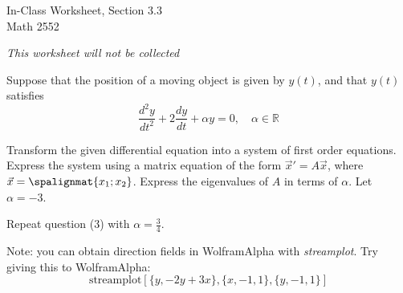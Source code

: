 \documentclass[12pt]{exam}
\newcommand{\TestName}{In-Class Worksheet, Section 3.3}
\newcommand{\dydt}{{\frac{dy}{dt}}} %
\newcommand{\dydtt}{{\frac{d ^2y}{dt^2}}} %
\begin{document}
    
\vspace*{-.5cm}

\newcommand{\Course}{Math 2552}

\begin{center}
{\Large \TestName 
\\[4pt]
\Course}
\end{center}

\begin{center}    
{\small
\textit{This worksheet will not be collected}
}
\end{center}

\vspace{.5cm}


Suppose that the position of a moving object is given by $y(t)$, and that $y(t)$ satisfies $$\dydtt + 2\dydt + \alpha y = 0, \quad \alpha \in \mathbb R$$

\begin{questions}
    
        \question Transform the given differential equation into a system of first order equations. Express the system using a matrix equation of the form $\vec x ' = A \vec x$, where $\vec x = \spalignmat{x_1;x_2}$. 
        \question Express the eigenvalues of $A$ in terms of $\alpha$. 
        \question Let $\alpha = -3$. 
    
    \question Repeat question (3) with $\displaystyle \alpha = \frac34$.

\end{questions}

Note: you can obtain direction fields in WolframAlpha with \textit{streamplot}. Try giving this to WolframAlpha: $$\text{streamplot}[\{y,-2y+3x\},\{x,-1,1\},\{y,-1,1\}]$$
\end{document}
